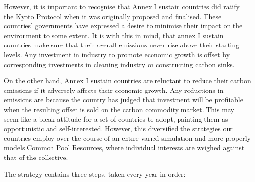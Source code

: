 However, it is important to recognise that Annex I sustain countries did ratify the Kyoto Protocol when it was originally proposed and finalised. These countries' governments have expressed a desire to minimise their impact on the environment to some extent. It is with this in mind, that annex I sustain countries make sure that their overall emissions never rise above their starting levels. Any investment in industry to promote economic growth is offset by corresponding investments in cleaning industry or constructing carbon sinks.

On the other hand, Annex I sustain countries are reluctant to reduce their carbon emissions if it adversely affects their economic growth. Any reductions in emissions are because the country has judged that investment will be profitable when the resulting offset is sold on the carbon commodity market. This may seem like a bleak attitude for a set of countries to adopt, painting them as opportunistic and self-interested. However, this diversified the strategies our countries employ over the course of an entire varied simulation and more properly models Common Pool Resources, where individual interests are weighed against that of the collective.

The strategy contains three steps, taken every year in order:

